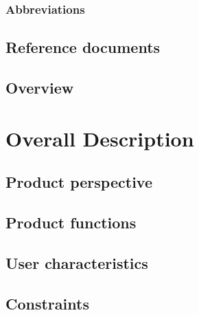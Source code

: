 \documentclass{article}
\begin{document}
\subsubsection{Abbreviations}


\subsection{Reference documents}
\subsubsection{}

\subsection{Overview}
\subsubsection{}

\section{Overall Description}
\subsection{Product perspective}
\subsubsection{}

\subsection{Product functions}
\subsubsection{}

\subsection{User characteristics}
\subsubsection{}

\subsection{Constraints}
\end{document}
